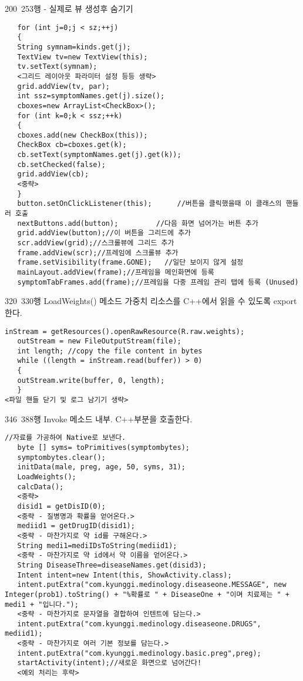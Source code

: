 \documentclass{report}
\begin{document}
200~253행 - 실제로 뷰 생성후 숨기기
\begin{verbatim}
   for (int j=0;j < sz;++j)
   {
   String symnam=kinds.get(j);
   TextView tv=new TextView(this);
   tv.setText(symnam);
   <그리드 레이아웃 파라미터 설정 등등 생략>
   grid.addView(tv, par);
   int ssz=symptomNames.get(j).size();
   cboxes=new ArrayList<CheckBox>();
   for (int k=0;k < ssz;++k)
   {
   cboxes.add(new CheckBox(this));
   CheckBox cb=cboxes.get(k);
   cb.setText(symptomNames.get(j).get(k));
   cb.setChecked(false);
   grid.addView(cb);
   <중략>
   }
   button.setOnClickListener(this);      //버튼을 클릭했을때 이 클래스의 핸들러 호출
   nextButtons.add(button);         //다음 화면 넘어가는 버튼 추가
   grid.addView(button);//이 버튼을 그리드에 추가
   scr.addView(grid);//스크롤뷰에 그리드 추가
   frame.addView(scr);//프레임에 스크롤뷰 추가
   frame.setVisibility(frame.GONE);   //일단 보이지 않게 설정
   mainLayout.addView(frame);//프레임을 메인화면에 등록
   symptomTabFrames.add(frame);//프레임을 다중 프레임 관리 탭에 등록 (Unused)
\end{verbatim}
320~330행 LoadWeights() 메소드 가중치 리소스를 C++에서 읽을 수 있도록 export한다.
\begin{verbatim}
inStream = getResources().openRawResource(R.raw.weights);
   outStream = new FileOutputStream(file); 
   int length; //copy the file content in bytes
   while ((length = inStream.read(buffer)) > 0)
   {
   outStream.write(buffer, 0, length); 
   } 
<파일 핸들 닫기 및 로그 남기기 생략>
\end{verbatim}
346~388행 Invoke 메소드 내부. C++부분을 호출한다.
\begin{verbatim}
//자료를 가공하여 Native로 보낸다.
   byte [] syms= toPrimitives(symptombytes);
   symptombytes.clear();
   initData(male, preg, age, 50, syms, 31);
   LoadWeights();
   calcData();
   <중략>
   disid1 = getDisID(0);
   <중략 - 질병명과 확률을 얻어온다.>
   mediid1 = getDrugID(disid1);
   <중략 - 마찬가지로 약 id를 구해온다.>
   String medi1=mediIDsToString(mediid1);
   <중략 - 마찬가지로 약 id에서 약 이름을 얻어온다.>
   String DiseaseThree=diseaseNames.get(disid3);
   Intent intent=new Intent(this, ShowActivity.class);
   intent.putExtra("com.kyunggi.medinology.diseaseone.MESSAGE", new Integer(prob1).toString() + "%확률로 " + DiseaseOne + "이며 치료제는 " + medi1 + "입니다.");
   <중략 - 마찬가지로 문자열을 결합하여 인텐트에 담는다.>
   intent.putExtra("com.kyunggi.medinology.diseaseone.DRUGS", mediid1);
   <중략 - 마찬가지로 여러 기본 정보를 담는다.>
   intent.putExtra("com.kyunggi.medinology.basic.preg",preg);
   startActivity(intent);//새로운 화면으로 넘어간다!
   <예외 처리는 후략>
  \end{verbatim}
\end{document}
